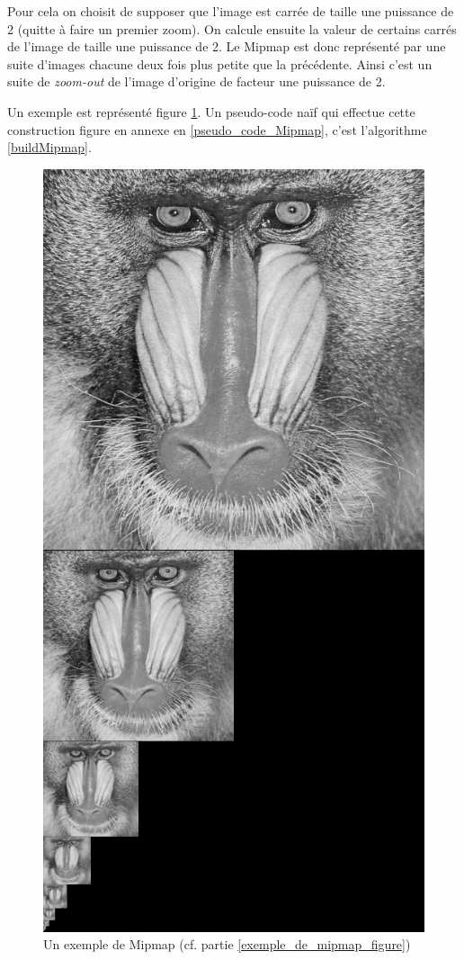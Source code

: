 Pour cela on choisit de supposer que l'image est carrée de taille une puissance de 2 (quitte à faire un premier zoom). On calcule ensuite la valeur de certains carrés de l'image de taille une puissance de 2.
Le Mipmap est donc représenté par une suite d'images chacune deux fois plus petite que la précédente. Ainsi c'est un suite de \emph{zoom-out} de l'image d'origine de facteur une puissance de 2. 

Un exemple est représenté figure \ref{MipMap_real}. Un pseudo-code naïf qui effectue cette construction figure en annexe en \ref{pseudo_code_Mipmap}, c'est l'algorithme \ref{buildMipmap}.
\label{exemple_de_mipmap_figure}
\begin{figure}[h!]
\centering
\includegraphics[scale=0.4]{MipMap_real} %
\caption{Un exemple de Mipmap (cf. partie \ref{exemple_de_mipmap_figure})}
\label{MipMap_real}
\end{figure}

